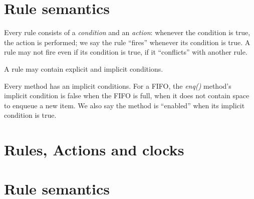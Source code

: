 \vspace{2ex}




\section{Rule semantics}




Every rule consists
of a \emph{condition} and an \emph{action}: whenever the condition is
true, the action is performed; we say the rule ``fires'' whenever its
condition is true.  A rule may not fire even if its condition is true,
if it ``conflicts'' with another rule.

A rule may contain explicit and implicit conditions. 

Every method has an implicit conditions.  For a FIFO, the \emph{enq()}
method's implicit condition is false when the FIFO is full, {\ie} when
it does not contain space to enqueue a new item.  We also say the
method is ``enabled'' when its implicit condition is true.

\section{Rules, Actions and clocks}

\section{Rule semantics}

